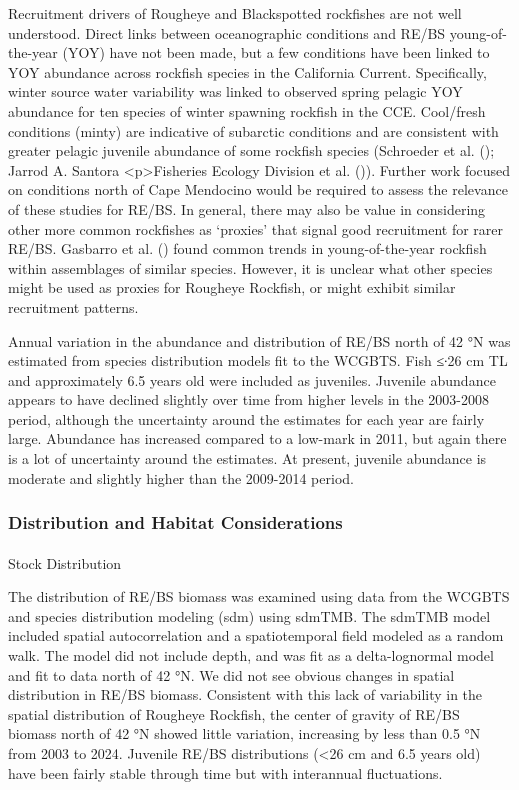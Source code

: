\documentclass[
]{scrartcl}
\makeatletter
\let\oldparagraph\paragraph
\renewcommand{\paragraph}{
    \@ifstar
      \xxxParagraphStar
      \xxxParagraphNoStar
  }
\newcommand{\xxxParagraphStar}[1]{\oldparagraph*{#1}\mbox{}}
\newcommand{\xxxParagraphNoStar}[1]{\oldparagraph{#1}\mbox{}}
\makeatother
\begin{document}
Recruitment drivers of Rougheye and Blackspotted rockfishes are not well
understood. Direct links between oceanographic conditions and RE/BS
young-of-the-year (YOY) have not been made, but a few conditions have
been linked to YOY abundance across rockfish species in the California
Current. Specifically, winter source water variability was linked to
observed spring pelagic YOY abundance for ten species of winter spawning
rockfish in the CCE. Cool/fresh conditions (minty) are indicative of
subarctic conditions and are consistent with greater pelagic juvenile
abundance of some rockfish species (Schroeder et al.
(); Jarrod A. Santora \textbar{}
\textless p\textgreater Fisheries Ecology Division et al.
()). Further work focused on
conditions north of Cape Mendocino would be required to assess the
relevance of these studies for RE/BS. In general, there may also be
value in considering other more common rockfishes as `proxies' that
signal good recruitment for rarer RE/BS. Gasbarro et al.
() found common trends in
young-of-the-year rockfish within assemblages of similar species.
However, it is unclear what other species might be used as proxies for
Rougheye Rockfish, or might exhibit similar recruitment patterns.

Annual variation in the abundance and distribution of RE/BS north of 42
°N was estimated from species distribution models fit to the WCGBTS.
Fish ≤∙26 cm TL and approximately 6.5 years old were included as
juveniles. Juvenile abundance appears to have declined slightly over
time from higher levels in the 2003-2008 period, although the
uncertainty around the estimates for each year are fairly large.
Abundance has increased compared to a low-mark in 2011, but again there
is a lot of uncertainty around the estimates. At present, juvenile
abundance is moderate and slightly higher than the 2009-2014 period.

\subsubsection{Distribution and Habitat
Considerations}\label{distribution-and-habitat-considerations}

\paragraph{Stock Distribution}\label{stock-distribution}

The distribution of RE/BS biomass was examined using data from the
WCGBTS and species distribution modeling (sdm) using sdmTMB. The sdmTMB
model included spatial autocorrelation and a spatiotemporal field
modeled as a random walk. The model did not include depth, and was fit
as a delta-lognormal model and fit to data north of 42 °N. We did not
see obvious changes in spatial distribution in RE/BS biomass. Consistent
with this lack of variability in the spatial distribution of Rougheye
Rockfish, the center of gravity of RE/BS biomass north of 42 °N showed
little variation, increasing by less than 0.5 °N from 2003 to 2024.
Juvenile RE/BS distributions (\textless26 cm and 6.5 years old) have
been fairly stable through time but with interannual fluctuations.
\end{document}
